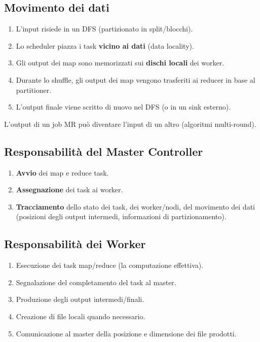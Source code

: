 \subsection{Movimento dei dati}

\begin{enumerate}
  \item L'input risiede in un DFS (partizionato in split/blocchi).
  \item Lo scheduler piazza i task \textbf{vicino ai dati} (data locality).
  \item Gli output dei map sono memorizzati sui \textbf{dischi locali}
    dei worker.
  \item Durante lo shuffle, gli output dei map vengono trasferiti ai
    reducer in base al partitioner.
  \item L'output finale viene scritto di nuovo nel DFS (o in un sink esterno).
\end{enumerate}

\begin{nota}
  L'output di un job MR può diventare l'input di un altro
  (algoritmi multi-round).
\end{nota}

\subsection{Responsabilità del Master Controller}

\begin{enumerate}
  \item \textbf{Avvio} dei map e reduce task.
  \item \textbf{Assegnazione} dei task ai worker.
  \item \textbf{Tracciamento} dello stato dei task, dei worker/nodi, del
    movimento dei dati (posizioni degli output intermedi, informazioni
    di partizionamento).
\end{enumerate}

\subsection{Responsabilità dei Worker}

\begin{enumerate}
  \item Esecuzione dei task map/reduce (la computazione effettiva).
  \item Segnalazione del completamento del task al master.
  \item Produzione degli output intermedi/finali.
  \item Creazione di file locali quando necessario.
  \item Comunicazione al master della posizione e dimensione dei file prodotti.
\end{enumerate}

